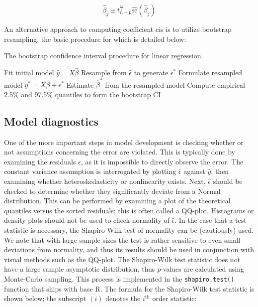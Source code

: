 \documentclass{report}
\begin{document}
\begin{equation}\label{eq:ols-beta-confidence-interval}
    \hat{\beta}_j \pm t^{\frac{\alpha}{2}}_{n-p} \widehat{\text{se}}\left(\hat{\beta}_j\right)
\end{equation}

An alternative approach to computing coefficient \glspl{ci} is to utilize bootstrap resampling, the basic procedure for which is detailed below:

\begin{algorithm}[h!]
    \caption{The bootstrap confidence interval procedure for linear regression.}\label{alg:linearBS}
    \begin{algorithmic}[1]
        \STATE Fit initial model $\hat{y} = X \hat{\beta}$
            \STATE Resample from $\hat{\epsilon}$ to generate $\epsilon^*$
            \STATE Formulate resampled model $y^* = X \hat{\beta} + \epsilon^*$
            \STATE Estimate $\hat{\beta}^*$ from the resampled model
        \ENDFOR
    \STATE Compute empirical 2.5\% and 97.5\% quantiles to form the bootstrap CI
    \end{algorithmic}
\end{algorithm}

\subsection{Model diagnostics}

One of the more important steps in model development is checking whether or not assumptions concerning the error are violated. This is typically done by examining the residuals $\hat{\epsilon}$, as it is impossible to directly observe the error. The constant variance assumption is interrogated by plotting $\hat{\epsilon}$ against $\hat{y}$, then examining whether heteroskedasticity or nonlinearity exists. Next, $\hat{\epsilon}$ should be checked to determine whether they significantly deviate from a Normal distribution. This can be performed by examining a plot of the theoretical quantiles versus the sorted residuals; this is often called a QQ-plot. Histograms or density plots should not be used to check normality of $\hat{\epsilon}$. In the case that a test statistic is necessary, the Shapiro-Wilk test of normality can be (cautiously) used. We note that with large sample sizes the test is rather sensitive to even small deviations from normality, and thus its results should be used in conjunction with visual methods such as the QQ-plot. The Shapiro-Wilk test statistic does not have a large sample asymptotic distribution, thus \textit{p}-values are calculated using Monte-Carlo sampling. This process is implemented in the \texttt{shapiro.test()} function that ships with base R. The formula for the Shapiro-Wilk test statistic is shown below; the subscript $(i)$ denotes the $i^{\text{th}}$ order statistic:
\end{document}
